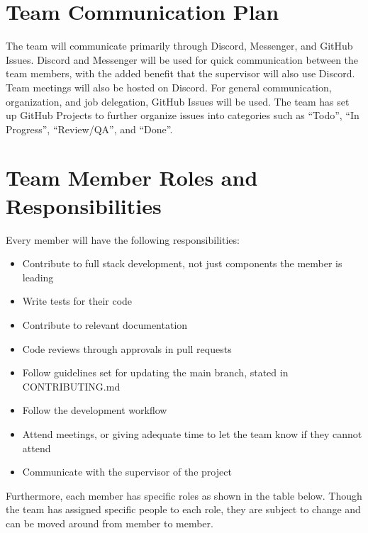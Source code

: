 \documentclass{article}
\begin{document}
\section{Team Communication Plan}

The team will communicate primarily through Discord, Messenger, and GitHub Issues. Discord and
Messenger will be used for quick communication between the team members, with the added benefit
that the supervisor will also use Discord. Team meetings will also be hosted on Discord. For
general communication, organization, and job delegation, GitHub Issues will be used. The team has
set up GitHub Projects to further organize issues into categories such as ``Todo'', ``In
Progress'', ``Review/QA'', and ``Done''.

\section{Team Member Roles and Responsibilities}

Every member will have the following responsibilities:

\begin{itemize}
	\item Contribute to full stack development, not just components the member is leading
	\item Write tests for their code
	\item Contribute to relevant documentation
	\item Code reviews through approvals in pull requests
	\item Follow guidelines set for updating the main branch, stated in CONTRIBUTING.md
	\item Follow the development workflow
	\item Attend meetings, or giving adequate time to let the team know if they cannot attend
	\item Communicate with the supervisor of the project
\end{itemize}

Furthermore, each member has specific roles as shown in the table below. Though the team has
assigned specific people to each role, they are subject to change and can be moved around from
member to member.
\end{document}
